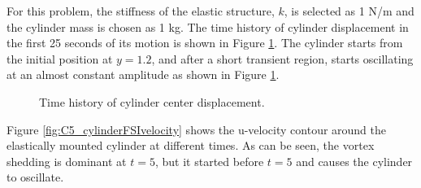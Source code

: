 For this problem, the stiffness of the elastic structure, $k$, is selected as 1 N/m and the cylinder mass is chosen as 1 kg. The time history of cylinder displacement in the first 25 seconds of its motion is shown in Figure \ref{fig:C5_cylinderDisplacement}. The cylinder starts from the initial position at $y=1.2$, and after a short transient region, starts oscillating at an almost constant amplitude as shown in Figure \ref{fig:C5_cylinderDisplacement}.
%
\begin{figure}[H]
    \centering
    \quad
    \caption{Time history of cylinder center displacement.}
    \label{fig:C5_cylinderDisplacement}
\end{figure}
%
Figure \ref{fig:C5_cylinderFSIvelocity} shows the u-velocity contour around the elastically mounted cylinder at different times. As can be seen, the vortex shedding is dominant at $t=5$, but it started before $t=5$ and causes the cylinder to oscillate.
%

